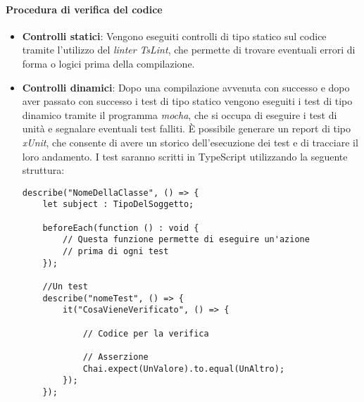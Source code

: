 \paragraph*{Procedura di verifica del codice}
\begin{itemize}

\item \textbf{Controlli statici}: Vengono eseguiti controlli di tipo statico sul codice tramite l'utilizzo del \textit{linter} \textit{TsLint}, che permette di trovare eventuali errori di forma o logici prima della compilazione.

\item \textbf{Controlli dinamici}: Dopo una compilazione avvenuta con successo e dopo aver passato con successo i test di tipo statico vengono eseguiti i test di tipo dinamico tramite il programma \textit{mocha}, che si occupa di eseguire i test di unità e segnalare eventuali test falliti. È possibile generare un report di tipo \textit{xUnit}, che consente di avere un storico dell'esecuzione dei test e di tracciare il loro andamento. I test saranno scritti in TypeScript utilizzando la seguente struttura:
\begin{verbatim}
describe("NomeDellaClasse", () => {
    let subject : TipoDelSoggetto;

    beforeEach(function () : void {
        // Questa funzione permette di eseguire un'azione
        // prima di ogni test
    });

    //Un test
    describe("nomeTest", () => {
        it("CosaVieneVerificato", () => {

            // Codice per la verifica

            // Asserzione
            Chai.expect(UnValore).to.equal(UnAltro);
        });
    });
  
\end{verbatim}

\end{itemize}
